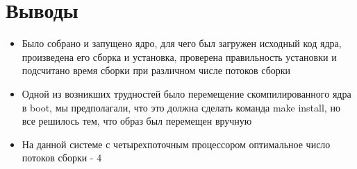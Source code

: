 \documentclass[a4paper]{article}
\begin{document}
    \section{Выводы}
    \begin{itemize}
        \item Было собрано и запущено ядро, для чего был загружен исходный код ядра,
        произведена его сборка и установка, проверена правильность установки и
        подсчитано время сборки при различном числе потоков сборки
        \item Одной из возникших трудностей было перемещение скомпилированного ядра в boot, мы
        предполагали, что это должна сделать команда make install, но все решилось
        тем, что образ был перемещен вручную
        \item На данной системе с четырехпоточным процессором оптимальное число потоков сборки - 4
    \end{itemize}
\end{document}
